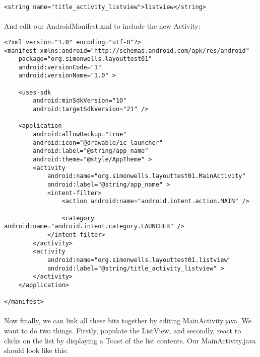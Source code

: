 \begin{lstlisting}
<string name="title_activity_listview">listview</string>
\end{lstlisting}

\paragraph{} And edit our AndroidManifest.xml to include the new Activity:

\begin{lstlisting}
<?xml version="1.0" encoding="utf-8"?>
<manifest xmlns:android="http://schemas.android.com/apk/res/android"
    package="org.simonwells.layouttest01"
    android:versionCode="1"
    android:versionName="1.0" >

    <uses-sdk
        android:minSdkVersion="10"
        android:targetSdkVersion="21" />

    <application
        android:allowBackup="true"
        android:icon="@drawable/ic_launcher"
        android:label="@string/app_name"
        android:theme="@style/AppTheme" >
        <activity
            android:name="org.simonwells.layouttest01.MainActivity"
            android:label="@string/app_name" >
            <intent-filter>
                <action android:name="android.intent.action.MAIN" />

                <category android:name="android.intent.category.LAUNCHER" />
            </intent-filter>
        </activity>
        <activity
            android:name="org.simonwells.layouttest01.listview"
            android:label="@string/title_activity_listview" >
        </activity>
    </application>

</manifest>
\end{lstlisting}

\paragraph{} Now finally, we can link all these bits together by editing MainActivity.java. We want to do two things. Firstly, populate the ListView, and secondly, react to clicks on the list by displaying a Toast of the list contents. Our MainActivity.java should look like this:

